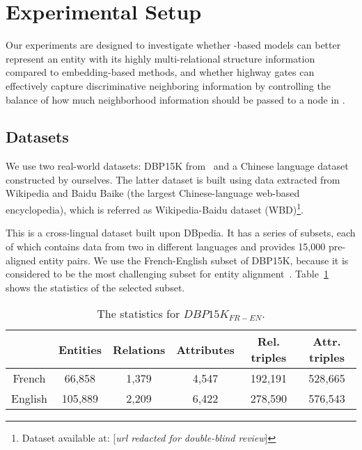\section{Experimental Setup}
	Our experiments are designed to investigate whether \RGCN-based models can better represent an entity with its highly multi-relational
structure information compared to \KG embedding-based methods, and whether highway gates can effectively capture discriminative neighboring
information by controlling the balance of how much neighborhood information should be passed to a node in \RGCN.

\subsection{Datasets}
\label{subsection:datasets}
	We use two real-world datasets: DBP15K from~\cite{sun2017cross} and a Chinese language dataset constructed by ourselves. The latter
dataset is built using data extracted from Wikipedia and Baidu Baike (the largest Chinese-language web-based encyclopedia), which is
referred as Wikipedia-Baidu dataset (WBD)\footnote{Dataset available at: [\emph{url redacted for double-blind review}]}.
	
	 This is a cross-lingual dataset built upon DBpedia.
	It has a series of subsets, each of which contains data from two \KGs in different languages and provides 15,000 pre-aligned entity pairs.
	We use the French-English subset of DBP15K, because it is considered to be the most challenging subset for entity alignment~\cite{sun2017cross}.
     Table~\ref{dbp} shows the statistics of the selected subset.
	
		\begin{table}
		\centering
		\scriptsize
		\begin{tabular}{c|ccccc}
			\toprule
			&\bf  Entities &\bf  Relations &\bf  Attributes &\bf  Rel. triples &\bf  Attr. triples \\
			\midrule
			French & 66,858 & 1,379 & 4,547 & 192,191 & 528,665 \\
			English & 105,889 & 2,209 & 6,422 & 278,590 & 576,543 \\
			\bottomrule
		\end{tabular}
		\caption{The statistics for $DBP15K_{FR-EN}$.}
		\label{dbp}
	\end{table}
	
